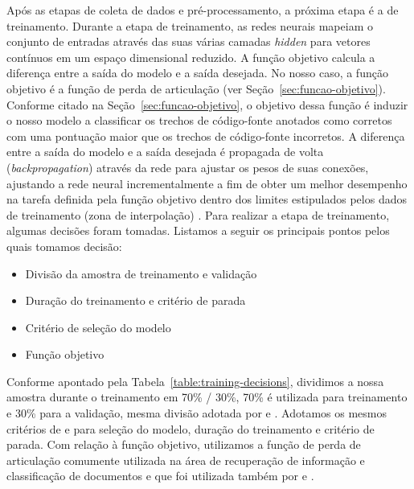 Após as etapas de coleta de dados e pré-processamento, a próxima etapa é a de treinamento. Durante a etapa de treinamento, as redes neurais mapeiam o conjunto de entradas através das suas várias camadas \textit{hidden} para vetores contínuos em um espaço dimensional reduzido. A função objetivo calcula a diferença entre a saída do modelo e a saída desejada. No nosso caso, a função objetivo é a função de perda de articulação (ver Seção~\ref{sec:funcao-objetivo}). Conforme citado na Seção~\ref{sec:funcao-objetivo}, o objetivo dessa função é induzir o nosso modelo a classificar os trechos de código-fonte anotados como corretos com uma pontuação maior que os trechos de código-fonte incorretos. A diferença entre a saída do modelo e a saída desejada é propagada de volta (\textit{backpropagation}) através da rede para ajustar os pesos de suas conexões, ajustando a rede neural incrementalmente a fim de obter um melhor desempenho na tarefa definida pela função objetivo dentro dos limites estipulados pelos dados de treinamento (zona de interpolação) \citep{hasson-direct-fit-to-nature-evolutionary-perspective-ann:2020}. Para realizar a etapa de treinamento, algumas decisões foram tomadas. Listamos a seguir os principais pontos pelos quais tomamos decisão:

\begin{itemize}
    \item Divisão da amostra de treinamento e validação
    \item Duração do treinamento e critério de parada
    \item Critério de seleção do modelo
    \item Função objetivo
\end{itemize}

Conforme apontado pela Tabela~\ref{table:training-decisions}, dividimos a nossa amostra durante o treinamento em 70\% / 30\%, 70\% é utilizada para treinamento e 30\% para a validação, mesma divisão adotada por \cite{yao-2018} e \cite{cambronero-deep-learning-code-search:2019}. Adotamos os mesmos critérios de \cite{iyer-etal-2016-summarizing} e \cite{yao-2018} para seleção do modelo, duração do treinamento e critério de parada. Com relação à função objetivo, utilizamos a função de perda de articulação comumente utilizada na área de recuperação de informação e classificação de documentos e que foi utilizada também por \cite{Gu-deep-code-search:2018} e \cite{cambronero-deep-learning-code-search:2019}.


